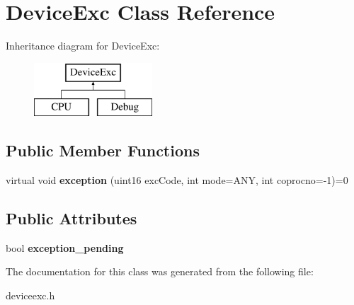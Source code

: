 \hypertarget{classDeviceExc}{
\section{DeviceExc Class Reference}
\label{classDeviceExc}
}
Inheritance diagram for DeviceExc:\begin{figure}[H]
\begin{center}
\leavevmode
\includegraphics[height=2cm]{classDeviceExc}
\end{center}
\end{figure}
\subsection*{Public Member Functions}
\begin{DoxyCompactItemize}
\item 
\hypertarget{classDeviceExc_adfa40efde878b6499d3ffc66b4fa7166}{
virtual void {\bfseries exception} (uint16 excCode, int mode=ANY, int coprocno=-\/1)=0}
\label{classDeviceExc_adfa40efde878b6499d3ffc66b4fa7166}

\end{DoxyCompactItemize}
\subsection*{Public Attributes}
\begin{DoxyCompactItemize}
\item 
\hypertarget{classDeviceExc_affa8f27155e9b97d0f2d76383a29489f}{
bool {\bfseries exception\_\-pending}}
\label{classDeviceExc_affa8f27155e9b97d0f2d76383a29489f}

\end{DoxyCompactItemize}


The documentation for this class was generated from the following file:\begin{DoxyCompactItemize}
\item 
deviceexc.h\end{DoxyCompactItemize}

